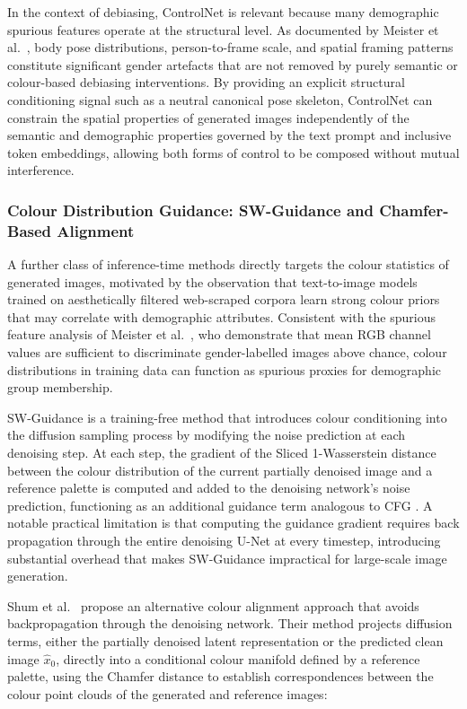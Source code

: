 In the context of debiasing, ControlNet is relevant because many demographic spurious features operate at the structural level. As documented by Meister et al.~\cite{Meister_2023_GenderArtifactsinVisualDatasets}, body pose distributions, person-to-frame scale, and spatial framing patterns constitute significant gender artefacts that are not removed by purely semantic or colour-based debiasing interventions. By providing an explicit structural conditioning signal such as a neutral canonical pose skeleton, ControlNet can constrain the spatial properties of generated images independently of the semantic and demographic properties governed by the text prompt and inclusive token embeddings, allowing both forms of control to be composed without mutual interference.

\subsubsection*{Colour Distribution Guidance: SW-Guidance and Chamfer-Based Alignment}
\label{subsubsec:colour_guidance}

A further class of inference-time methods directly targets the colour statistics of generated images, motivated by the observation that text-to-image models trained on aesthetically filtered web-scraped corpora learn strong colour priors that may correlate with demographic attributes. Consistent with the spurious feature analysis of Meister et al.~\cite{Meister_2023_GenderArtifactsinVisualDatasets}, who demonstrate that mean RGB channel values are sufficient to discriminate gender-labelled images above chance, colour distributions in training data can function as spurious proxies for demographic group membership.

SW-Guidance \cite{Lobashev_2025_SWGuidance} is a training-free method that introduces colour conditioning into the diffusion sampling process by modifying the noise prediction at each denoising step. At each step, the gradient of the Sliced 1-Wasserstein distance between the colour distribution of the current partially denoised image and a reference palette is computed and added to the denoising network's noise prediction, functioning as an additional guidance term analogous to CFG \cite{Ho_2022_CFG}. A notable practical limitation is that computing the guidance gradient requires back propagation through the entire denoising U-Net at every timestep, introducing substantial overhead that makes SW-Guidance impractical for large-scale image generation.

Shum et al.~\cite{Shum_2025_ColorAlignment} propose an alternative colour alignment approach that avoids backpropagation through the denoising network. Their method projects diffusion terms, either the partially denoised latent representation or the predicted clean image $\hat{x}_0$, directly into a conditional colour manifold defined by a reference palette, using the Chamfer distance to establish correspondences between the colour point clouds of the generated and reference images:

